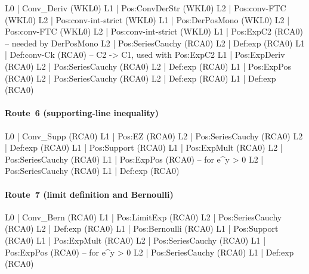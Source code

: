 \documentclass[11pt,reqno]{amsart}
\theoremstyle{redplain}
\numberwithin{equation}{section}
\begin{document}
\begin{verbatimbox}
	L0 | Conv_Deriv                         (WKL0)
	L1 |   Pos:ConvDerStr                   (WKL0)
	L2 |     Pos:conv-FTC                   (WKL0)
	L2 |     Pos:conv-int-strict            (WKL0)
	L1 |   Pos:DerPosMono                   (WKL0)
	L2 |     Pos:conv-FTC                   (WKL0)
	L2 |     Pos:conv-int-strict            (WKL0)
	L1 |   Pos:ExpC2                        (RCA0)  -- needed by DerPosMono
	L2 |     Pos:SeriesCauchy               (RCA0)
	L2 |     Def:exp                        (RCA0)
	L1 |   Def:conv-Ck                      (RCA0)  -- C2 -> C1, used with Pos:ExpC2
	L1 |   Pos:ExpDeriv                     (RCA0)
	L2 |     Pos:SeriesCauchy               (RCA0)
	L2 |     Def:exp                        (RCA0)
	L1 |   Pos:ExpPos                       (RCA0)
	L2 |     Pos:SeriesCauchy               (RCA0)
	L2 |     Def:exp                        (RCA0)
	L1 |   Def:exp                          (RCA0)
\end{verbatimbox}

\paragraph{Route~6 (supporting-line inequality)}

\begin{verbatimbox}
	L0 | Conv_Supp                          (RCA0)
	L1 |   Pos:EZ                           (RCA0)
	L2 |     Pos:SeriesCauchy               (RCA0)
	L2 |     Def:exp                        (RCA0)
	L1 |   Pos:Support                      (RCA0)
	L1 |   Pos:ExpMult                      (RCA0)
	L2 |     Pos:SeriesCauchy               (RCA0)
	L1 |   Pos:ExpPos                       (RCA0)  -- for e^y > 0
	L2 |     Pos:SeriesCauchy               (RCA0)
	L1 |   Def:exp                          (RCA0)
\end{verbatimbox}

\paragraph{Route~7 (limit definition and Bernoulli)}

\begin{verbatimbox}
	L0 | Conv_Bern                          (RCA0)
	L1 |   Pos:LimitExp                     (RCA0)
	L2 |     Pos:SeriesCauchy               (RCA0)
	L2 |     Def:exp                        (RCA0)
	L1 |   Pos:Bernoulli                    (RCA0)
	L1 |   Pos:Support                      (RCA0)
	L1 |   Pos:ExpMult                      (RCA0)
	L2 |     Pos:SeriesCauchy               (RCA0)
	L1 |   Pos:ExpPos                       (RCA0)  -- for e^y > 0
	L2 |     Pos:SeriesCauchy               (RCA0)
	L1 |   Def:exp                          (RCA0)
\end{verbatimbox}
\end{document}
